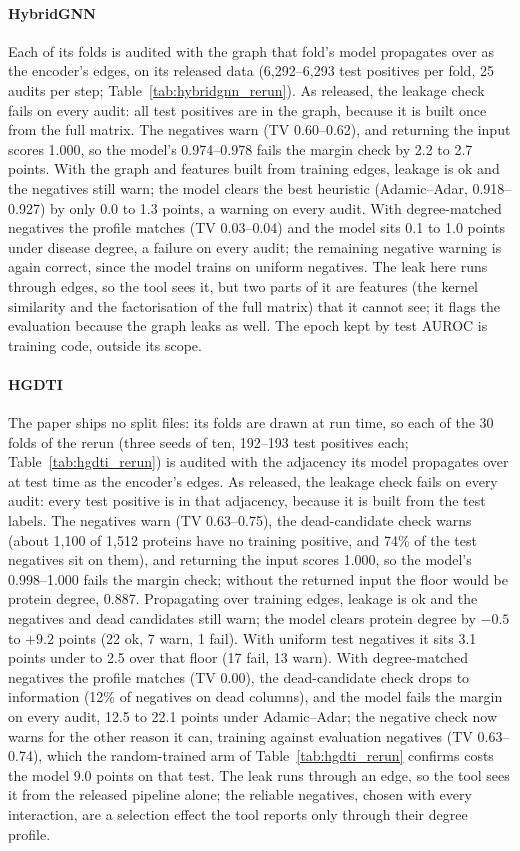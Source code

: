 \documentclass[review]{elsarticle}
\begin{document}
\paragraph{HybridGNN} Each of its folds is audited with the graph that fold's model propagates over as the
encoder's edges, on its released data (6,292--6,293 test positives per fold, 25 audits per step;
Table~\ref{tab:hybridgnn_rerun}). As released, the leakage check fails on every audit: all test positives
are in the graph, because it is built once from the full matrix. The negatives warn (TV 0.60--0.62), and
returning the input scores 1.000, so the model's 0.974--0.978 fails the margin check by 2.2 to 2.7 points.
With the graph and features built from training edges, leakage is ok and the negatives still warn; the
model clears the best heuristic (Adamic--Adar, 0.918--0.927) by only 0.0 to 1.3 points, a warning on every
audit. With degree-matched negatives the profile matches (TV 0.03--0.04) and the model sits 0.1 to 1.0 points
under disease degree, a failure on every audit; the remaining negative warning is again correct, since the
model trains on uniform negatives. The leak here runs through edges, so the tool sees it, but two parts of it
are features (the kernel similarity and the factorisation of the full matrix) that it cannot see; it flags the
evaluation because the graph leaks as well. The epoch kept by test AUROC is training code, outside its scope.

\paragraph{HGDTI} The paper ships no split files: its folds are drawn at run time, so each of the 30 folds of
the rerun (three seeds of ten, 192--193 test positives each; Table~\ref{tab:hgdti_rerun}) is audited with the
adjacency its model propagates over at test time as the encoder's edges. As released, the leakage check fails
on every audit: every test positive is in that adjacency, because it is built from the test labels. The
negatives warn (TV 0.63--0.75), the dead-candidate check warns (about 1,100 of 1,512 proteins have no training
positive, and 74\% of the test negatives sit on them), and returning the input scores 1.000, so the model's
0.998--1.000 fails the margin check; without the returned input the floor would be protein degree, 0.887.
Propagating over training edges, leakage is ok and the negatives and dead candidates still warn; the model
clears protein degree by $-0.5$ to $+9.2$ points (22 ok, 7 warn, 1 fail). With uniform test negatives it
sits 3.1 points under to 2.5 over that floor (17 fail, 13 warn). With degree-matched negatives the profile
matches (TV 0.00), the dead-candidate check drops to information (12\% of negatives on dead columns), and the
model fails the margin on every audit, 12.5 to 22.1 points under Adamic--Adar; the negative check now warns
for the other reason it can, training against evaluation negatives (TV 0.63--0.74), which the random-trained
arm of Table~\ref{tab:hgdti_rerun} confirms costs the model 9.0 points on that test. The leak runs through an
edge, so the tool sees it from the released pipeline alone; the reliable negatives, chosen with every
interaction, are a selection effect the tool reports only through their degree profile.
\end{document}
